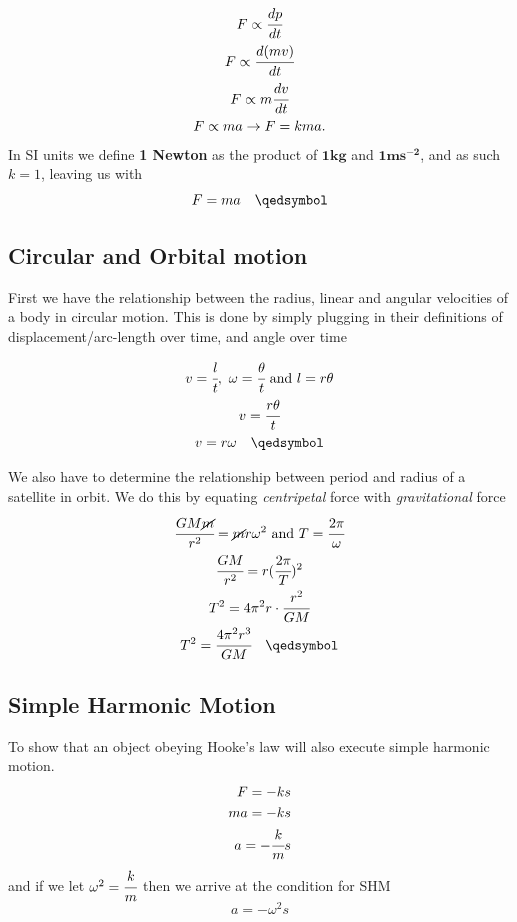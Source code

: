 \documentclass[10pt,a4paper]{article}
\begin{document}
\begin{gather*}
    F \propto \cfrac{dp}{dt} \\
    F \propto \cfrac{d(mv)}{dt} \\
    F \propto m \cfrac{dv}{dt} \\
    F \propto ma \rightarrow F = kma.
\end{gather*}
In SI units we define  \textbf{1 Newton} as the product of \textbf{$\textbf{1kg}$} and $\mathbf{1ms^{-2}}$, and as such $k=1$, leaving us with
\begin{equation*}
    F=ma \quad \qedsymbol
\end{equation*}

\subsection{Circular and Orbital motion}
First we have the relationship between the radius, linear and angular velocities of a body in circular motion. This is done by simply plugging in their definitions of displacement/arc-length over time, and angle over time

\begin{gather*}
    v = \cfrac{l}{t}, \ \omega = \cfrac{\theta}{t} \text{ and } l = r \theta \\ 
    v = \cfrac{r \theta}{t} \\
    v = r\omega \quad \qedsymbol
\end{gather*}

We also have to determine the relationship between period and radius of a satellite in orbit. We do this by equating \textit{centripetal} force with \textit{gravitational} force
\begin{gather*}
    \cfrac{GM\cancel{m}}{r^2} = \cancel{m}r\omega ^2 \text{ and } T = \cfrac{2\pi}{\omega}\\
    \cfrac{GM}{r^2} =  r (\cfrac{2\pi}{T})^2 \\
    T^2 = 4\pi^2 r\cdot \cfrac{r^2}{GM} \\
    T^2 = \cfrac{4\pi^2r^3}{GM} \quad \qedsymbol
\end{gather*}

\subsection{Simple Harmonic Motion}
To show that an object obeying Hooke's law will also execute simple harmonic motion.
\begin{align*}
    F=-ks \\
    ma = -ks \\
    a = -\cfrac{k}{m}s \\
\end{align*}
and if we let $\omega^2 = \cfrac{k}{m}$ then we arrive at the condition for SHM
\begin{equation*}
    a=-\omega^2 s
\end{equation*}
\end{document}
